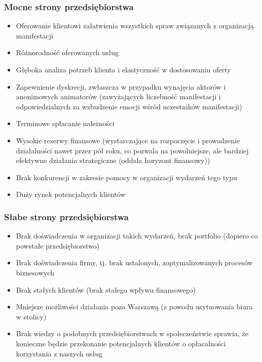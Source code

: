 \documentclass{article}
\begin{document}
\subsubsection{Mocne strony przedsiębiorstwa}
\begin{itemize}
\item Oferowanie klientowi załatwienia wszystkich spraw związanych z organizacją manifestacji
\item Różnorodność oferowanych usług
\item Głęboka analiza potrzeb klienta i elastyczność w dostosowaniu oferty
\item Zapewnienie dyskrecji, zwłaszcza w przypadku wynajęcia aktorów i anonimowych animatorów (zawyżających liczebność manifestacji i odpowiedzialnych za wzbudzenie emocji wśród uczestników manifestacji)
\item Terminowe spłacanie należności
\item Wysokie rezerwy finansowe (wystarczające na rozpoczęcie i prowadzenie działalności nawet przez pół roku, co pozwala na powolniejsze, ale bardziej efektywne działania strategiczne (oddala horyzont finansowy))
\item Brak konkurencji w zakresie pomocy w organizacji wydarzeń tego typu
\item Duży rynek potencjalnych klientów
\end{itemize}
\subsubsection{Słabe strony przedsiębiorstwa}
\begin{itemize}
\item Brak doświadczenia w organizacji takich wydarzeń, brak portfolio (dopiero co powstałe przedsiębiorstwo)
\item Brak doświadczenia firmy, tj. brak ustalonych, zoptymalizowanych procesów biznesowych
\item Brak stałych klientów (brak stałego wpływu finansowego)
\item Mniejsze możliwości działania poza Warszawą (z powodu usytuowania biura w stolicy)
\item Brak wiedzy o podobnych przedsiębiorstwach w społeczeństwie sprawia, że konieczne będzie przekonanie potencjalnych klientów o opłacalności korzystania z naszych usług
\end{itemize}
\end{document}
